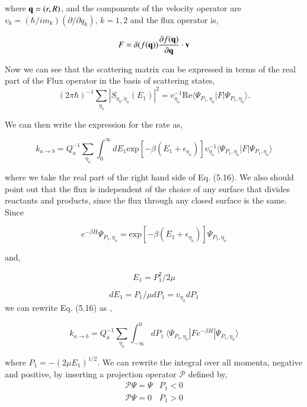 \documentclass[phd,tocprelim]{cornell}
\begin{document}
where ${\bf{q}} =(r,R)$, and the components of the velocity operator are $v_k = (\hbar/im_k)(\partial/\partial q_k)$, $k=1,2$ and the flux operator is, 

\begin{equation}
F=\delta ( f({\bf{q}})) \frac{\partial f({\bf{q}})}{\partial {\bf{q}}} \cdot {\bf{v}}
\end{equation}

Now we can see that the scattering matrix can be expressed in terms of the real part of the Flux operator in the basis of scattering states, 
\begin{equation}
(2\pi\hbar)^{-1} \sum_{\eta_b}|S_{\eta_b, \eta_a}(E_1)|^2 = v_{\eta_a}^{-1} \textrm{Re} \langle \Psi_{P_1, \eta_a}|F| \Psi_{P_1, \eta_a} \rangle. 
\end{equation}

We can then write the expression for the rate as, 

\begin{equation}
k_{a\to b} = Q_{a}^{-1}\sum_{\eta_a} \int_{0}^{\infty} dE_1 \textrm{exp}[-\beta(E_1 +\epsilon_{\eta_a})] v_{\eta_a}^{-1} \langle \Psi_{P_1, \eta_a}|F| \Psi_{P_1, \eta_a} \rangle
\end{equation}

where we take the real part of the right hand side of Eq. (5.16). We also should point out that the flux is independent of the choice of any surface that divides reactants and products, since the flux through any closed surface is the same. Since 

\begin{equation}
e^{-\beta H} \Psi_{P_1, \eta_a} = \textrm{exp} [-\beta ( E_1+ \epsilon_{\eta_a})] \Psi_{P_1, \eta_a}
\end{equation}

and, 

\begin{equation}
E_1 =P_1^2/2\mu
\end{equation}

\begin{equation}
dE_1 =P_1/\mu dP_1 = v_{\eta_a} dP_1
\end{equation}
we can rewrite Eq. (5.16) as , 

\begin{equation}
k_{a\to b} = Q_{a}^{-1}\sum_{\eta_a} \int_{-\infty}^{0} dP_1 \ \langle \Psi_{P_1, \eta_a}|F e^{-\beta H} | \Psi_{P_1, \eta_a} \rangle
\end{equation}

where $P_1 = -(2\mu E_1)^{1/2}$. We can rewrite the integral over all momenta, negative and positive, by inserting a projection operator $\mathcal{P}$ defined by, 
\begin{equation}
     \begin{array}{ll}
      \mathcal{P}\Psi= \Psi& P_1<0\\
      \mathcal{P}\Psi= 0 &P_1>0
    \end{array}
    \label{eq:hs}
\end{equation}
\end{document}
